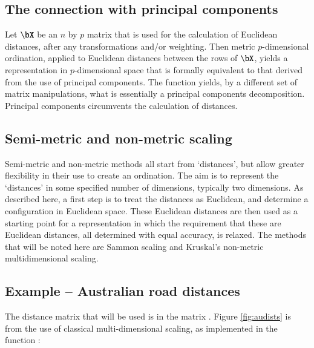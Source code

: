\subsection*{The connection with principal components}
Let $\bX$ be an $n$ by $p$ matrix that is used for the calculation of
Euclidean distances, after any transformations and/or weighting.
Then metric $p$-dimensional ordination, applied to Euclidean distances
between the rows of $\bX$, yields a representation in $p$-dimensional
space that is formally equivalent to that derived from the use of
principal components.  The function  yields, by a
different set of matrix manipulations, what is essentially a principal
components decomposition.  Principal components circumvents the
calculation of distances.

\subsection*{Semi-metric and non-metric scaling}

Semi-metric and non-metric methods all start from `distances', but
allow greater flexibility in their use to create an ordination. The
aim is to represent the `distances' in some specified number of
dimensions, typically two dimensions.  As described here, a first step
is to treat the distances as Euclidean, and determine a configuration
in Euclidean space.  These Euclidean distances are then used as a
starting point for a representation in which the requirement that
these are Euclidean distances, all determined with equal accuracy, is
relaxed.  The methods that will be noted here are Sammon scaling and
Kruskal's non-metric multidimensional scaling.

\subsection*{Example -- Australian road distances}
The distance matrix that will be used is in the matrix 
.  Figure \ref{fig:audists} is from the
use of classical multi-dimensional scaling, as implemented in the
function :

